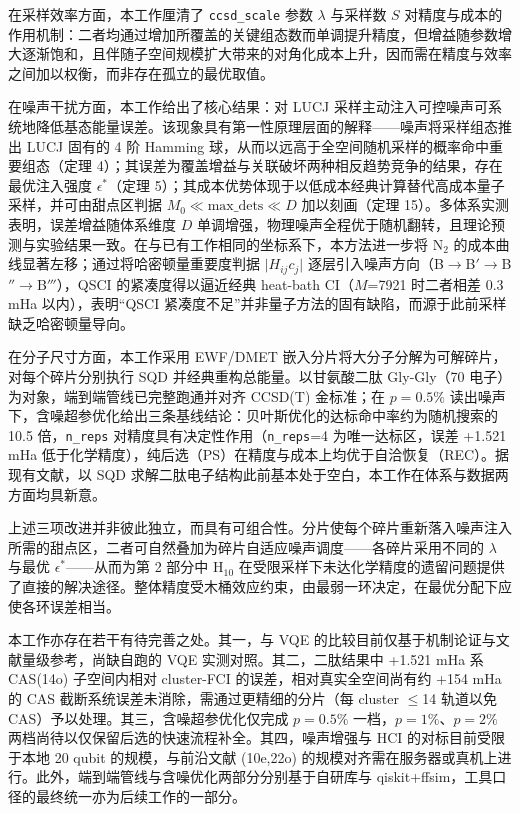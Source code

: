 \documentclass[UTF8,12pt,a4paper]{ctexart}
\newcommand{\Ntwo}{N$_2$}
\begin{document}
在采样效率方面，本工作厘清了 \texttt{ccsd\_scale} 参数 $\lambda$ 与采样数 $S$ 对精度与成本的作用机制：二者均通过增加所覆盖的关键组态数而单调提升精度，但增益随参数增大逐渐饱和，且伴随子空间规模扩大带来的对角化成本上升，因而需在精度与效率之间加以权衡，而非存在孤立的最优取值。

在噪声干扰方面，本工作给出了核心结果：对 LUCJ 采样主动注入可控噪声可系统地降低基态能量误差。该现象具有第一性原理层面的解释——噪声将采样组态推出 LUCJ 固有的 4 阶 Hamming 球，从而以远高于全空间随机采样的概率命中重要组态（定理 4）；其误差为覆盖增益与关联破坏两种相反趋势竞争的结果，存在最优注入强度 $\epsilon^*$（定理 5）；其成本优势体现于以低成本经典计算替代高成本量子采样，并可由甜点区判据 $M_0\ll\text{max\_dets}\ll D$ 加以刻画（定理 15）。多体系实测表明，误差增益随体系维度 $D$ 单调增强，物理噪声全程优于随机翻转，且理论预测与实验结果一致。在与已有工作相同的坐标系下，本方法进一步将 \Ntwo{} 的成本曲线显著左移；通过将哈密顿量重要度判据 $\lvert H_{ij}c_j\rvert$ 逐层引入噪声方向（B$\rightarrow$B$'$$\rightarrow$B$''$$\rightarrow$B$'''$），QSCI 的紧凑度得以逼近经典 heat-bath CI（$M$=7921 时二者相差 0.3 mHa 以内），表明``QSCI 紧凑度不足''并非量子方法的固有缺陷，而源于此前采样缺乏哈密顿量导向。

在分子尺寸方面，本工作采用 EWF/DMET 嵌入分片将大分子分解为可解碎片，对每个碎片分别执行 SQD 并经典重构总能量。以甘氨酸二肽 Gly-Gly（70 电子）为对象，端到端管线已完整跑通并对齐 CCSD(T) 金标准；在 $p=0.5\%$ 读出噪声下，含噪超参优化给出三条基线结论：贝叶斯优化的达标命中率约为随机搜索的 10.5 倍，\texttt{n\_reps} 对精度具有决定性作用（\texttt{n\_reps}=4 为唯一达标区，误差 +1.521 mHa 低于化学精度），纯后选（PS）在精度与成本上均优于自洽恢复（REC）。据现有文献，以 SQD 求解二肽电子结构此前基本处于空白，本工作在体系与数据两方面均具新意。

上述三项改进并非彼此独立，而具有可组合性。分片使每个碎片重新落入噪声注入所需的甜点区，二者可自然叠加为碎片自适应噪声调度——各碎片采用不同的 $\lambda$ 与最优 $\epsilon^*$——从而为第 2 部分中 H$_{10}$ 在受限采样下未达化学精度的遗留问题提供了直接的解决途径。整体精度受木桶效应约束，由最弱一环决定，在最优分配下应使各环误差相当。

本工作亦存在若干有待完善之处。其一，与 VQE 的比较目前仅基于机制论证与文献量级参考，尚缺自跑的 VQE 实测对照。其二，二肽结果中 +1.521 mHa 系 CAS(14o) 子空间内相对 cluster-FCI 的误差，相对真实全空间尚有约 +154 mHa 的 CAS 截断系统误差未消除，需通过更精细的分片（每 cluster $\le$14 轨道以免 CAS）予以处理。其三，含噪超参优化仅完成 $p=0.5\%$ 一档，$p=1\%$、$p=2\%$ 两档尚待以仅保留后选的快速流程补全。其四，噪声增强与 HCI 的对标目前受限于本地 20 qubit 的规模，与前沿文献 (10e,22o) 的规模对齐需在服务器或真机上进行。此外，端到端管线与含噪优化两部分分别基于自研库与 qiskit+ffsim，工具口径的最终统一亦为后续工作的一部分。
\end{document}
